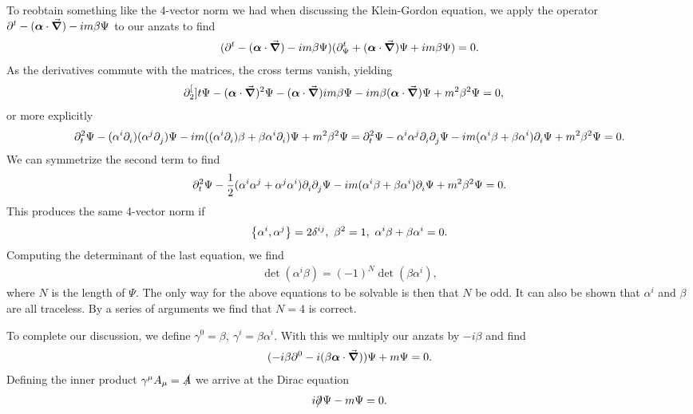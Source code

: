 To reobtain something like the 4-vector norm we had when discussing the Klein-Gordon equation, we apply the operator $\partial^{t}_{} - (\vb*{\alpha}\cdot\grad{}) - im\beta\Psi$ to our anzats to find
\begin{align*}
	(\partial^{t}_{} - (\vb*{\alpha}\cdot\grad{}) - im\beta\Psi)(\partial^{t}_{\Psi} + (\vb*{\alpha}\cdot\grad{})\Psi + im\beta\Psi) = 0.
\end{align*}
As the derivatives commute with the matrices, the cross terms vanish, yielding
\begin{align*}
	\partial^{[}_{2}]{t}{\Psi} - (\vb*{\alpha}\cdot\grad{})^{2}\Psi - (\vb*{\alpha}\cdot\grad{})im\beta\Psi - im\beta(\vb*{\alpha}\cdot\grad{})\Psi + m^{2}\beta^{2}\Psi &= 0,
\end{align*}
or more explicitly
\begin{align*}
	\partial^{2}_{t}{\Psi} - (\alpha^{i}\partial^{}_{i}{})(\alpha^{j}\partial^{}_{j}{})\Psi - im((\alpha^{i}\partial^{}_{i}{})\beta + \beta\alpha^{i}\partial^{}_{i}{})\Psi + m^{2}\beta^{2}\Psi = \partial^{2}_{t}{\Psi} - \alpha^{i}\alpha^{j}\partial^{}_{i}{\partial^{}_{j}{\Psi}} - im(\alpha^{i}\beta + \beta\alpha^{i})\partial^{}_{i}{\Psi} + m^{2}\beta^{2}\Psi = 0.
\end{align*}
We can symmetrize the second term to find
\begin{align*}
	\partial^{2}_{t}{\Psi} - \frac{1}{2}(\alpha^{i}\alpha^{j} + \alpha^{j}\alpha^{i})\partial^{}_{i}{\partial^{}_{j}{\Psi}} - im(\alpha^{i}\beta + \beta\alpha^{i})\partial^{}_{i}{\Psi} + m^{2}\beta^{2}\Psi = 0.
\end{align*}
This produces the same 4-vector norm if
\begin{align*}
	\acomm{\alpha^{i}}{\alpha^{j}} = 2\delta^{ij},\ \beta^{2} = 1,\ \alpha^{i}\beta + \beta\alpha^{i} = 0.
\end{align*}
Computing the determinant of the last equation, we find
\begin{align*}
	\det(\alpha^{i}\beta) = (-1)^{N}\det(\beta\alpha^{i}),
\end{align*}
where $N$ is the length of $\Psi$. The only way for the above equations to be solvable is then that $N$ be odd. It can also be shown that $\alpha^{i}$ and $\beta$ are all traceless. By a series of arguments we find that $N = 4$ is correct.

To complete our discussion, we define $\gamma^{0} = \beta,\ \gamma^{i} = \beta\alpha^{i}$. With this we multiply our anzats by $-i\beta$ and find
\begin{align*}
	(-i\beta\partial^{0}_{} - i(\beta\vb*{\alpha}\cdot\grad{}))\Psi + m\Psi = 0.
\end{align*}
Defining the inner product $\gamma^{\mu}A_{\mu} = \slashed{A}$ we arrive at the Dirac equation
\begin{align*}
	i\slashed{\partial^{}_{}{}}\Psi - m\Psi = 0.
\end{align*}


